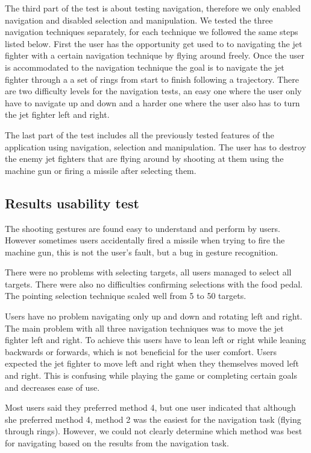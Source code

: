 \documentclass{acm_proc_article-sp}
\begin{document}
The third part of the test is about testing navigation, therefore we only enabled navigation and disabled selection and manipulation.
We tested the three navigation techniques separately, for each technique we followed the same steps listed below.
First the user has the opportunity get used to to navigating the jet fighter with a certain navigation technique by flying around freely.
Once the user is accommodated to the navigation technique the goal is to navigate the jet fighter through a a set of rings from start to finish following a trajectory.
There are two difficulty levels for the navigation tests, an easy one where the user only have to navigate up and down and a harder one where the user also has to turn the jet fighter left and right.

The last part of the test includes all the previously tested features of the application using navigation, selection and manipulation.
The user has to destroy the enemy jet fighters that are flying around by shooting at them using the machine gun or firing a missile after selecting them.

\subsection{Results usability test}
The shooting gestures are found easy to understand and perform by users. However sometimes users accidentally fired a missile when trying to fire the machine gun, this is not the user's fault, but a bug in gesture recognition.

There were no problems with selecting targets, all users managed to select all targets. There were also no difficulties confirming selections with the food pedal.
The pointing selection technique scaled well from 5 to 50 targets.

Users have no problem navigating only up and down and rotating left and right. The main problem with all three navigation techniques was to move the jet fighter left and right. To achieve this users have to lean left or right while leaning backwards or forwards, which is not beneficial for the user comfort. Users expected the jet fighter to move left and right when they themselves moved left and right. This is confusing while playing the game or completing certain goals and decreases ease of use.

Most users said they preferred method 4, but one user indicated that although she preferred method 4, method 2 was the easiest for the navigation task (flying through rings).
However, we could not clearly determine which method was best for navigating based on the results from the navigation task.
\end{document}

